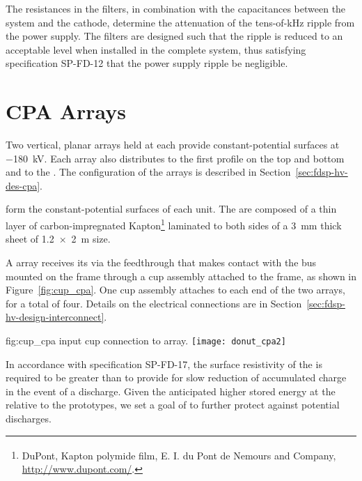 The resistances in the filters, in combination with the capacitances between the  system and the cathode,
 determine the attenuation of the tens-of-\si{\kilo\hertz} ripple from the power supply.  The filters  
are designed such that the ripple is reduced to an acceptable level when installed in the complete system, thus satisfying specification 
SP-FD-12 that the power supply ripple be negligible. 

\section{CPA Arrays}
\label{sec:fdsp-hv-cpa-arrays}

Two vertical, planar  arrays held at  each provide constant-potential surfaces at \SI{-180}{\kV}. %
Each  array also distributes  to the first profile on the top and bottom  and to the . The configuration of the  arrays is described in Section~\ref{sec:fdsp-hv-des-cpa}.


 form the constant-potential surfaces of each  unit. The  are  composed of a thin layer of carbon-impregnated Kapton\footnote{DuPont\texttrademark{}, Kapton\textsuperscript{\textregistered} polymide film,  E. I. du Pont de Nemours and Company,  \url{http://www.dupont.com/}.} laminated to both sides of a \SI{3}{\milli\meter} thick \frfour sheet of \SI{1.2 x 2}{\meter} size.  

A  array receives its  via the feedthrough that makes contact with the  bus mounted on the  frame through a cup assembly attached to the frame, as shown in Figure~\ref{fig:cup_cpa}. 
One cup assembly attaches to each end of the two  arrays, for a total of four. Details on the electrical connections are in Section~\ref{sec:fdsp-hv-design-interconnect}.

\begin{dunefigure}{fig:cup_cpa}{ input cup connection to  array.}
\texttt{[image: donut\_cpa2]} %
\end{dunefigure}

In accordance with specification SP-FD-17, 
the surface resistivity of the  is required to be greater than \cathodemegohm to provide for slow reduction of accumulated charge in the event of a discharge.  Given the anticipated higher stored energy at the  
relative to the prototypes, we set a goal of \cathodegigohm to further  protect against potential discharges.  
 
